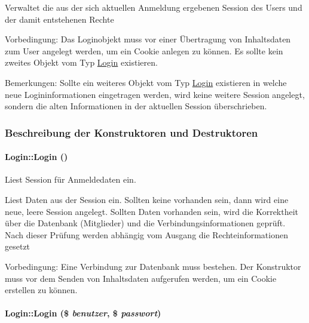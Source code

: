Verwaltet die aus der sich aktuellen Anmeldung ergebenen Session des Users und der damit entstehenen Rechte \begin{Desc}
\item[Vorbedingung:]Das Loginobjekt muss vor einer Übertragung von Inhaltsdaten zum User angelegt werden, um ein Cookie anlegen zu können. Es sollte kein zweites Objekt vom Typ \hyperlink{classLogin}{Login} existieren. \end{Desc}
\begin{Desc}
\item[Bemerkungen:]Sollte ein weiteres Objekt vom Typ \hyperlink{classLogin}{Login} existieren in welche neue Logininformationen eingetragen werden, wird keine weitere Session angelegt, sondern die alten Informationen in der aktuellen Session überschrieben. \end{Desc}




\subsubsection{Beschreibung der Konstruktoren und Destruktoren}
\hypertarget{classLogin_4847f3e07e43b540d3339392346f87ff}{
\paragraph[Login]{\setlength{\rightskip}{0pt plus 5cm}Login::Login ()}\hfill}
\label{classLogin_4847f3e07e43b540d3339392346f87ff}


Liest Session für Anmeldedaten ein. 

Liest Daten aus der Session ein. Sollten keine vorhanden sein, dann wird eine neue, leere Session angelegt. Sollten Daten vorhanden sein, wird die Korrektheit über die Datenbank (Mitglieder) und die Verbindungsinformationen geprüft. Nach dieser Prüfung werden abhängig vom Ausgang die Rechteinformationen gesetzt \begin{Desc}
\item[Vorbedingung:]Eine Verbindung zur Datenbank muss bestehen. Der Konstruktor muss vor dem Senden von Inhaltsdaten aufgerufen werden, um ein Cookie erstellen zu können. \end{Desc}
\hypertarget{classLogin_86b5c73ef1fb4bd03f91cc4771c960b7}{
\paragraph[Login]{\setlength{\rightskip}{0pt plus 5cm}Login::Login (\$ {\em benutzer}, \$ {\em passwort})}\hfill}
\label{classLogin_86b5c73ef1fb4bd03f91cc4771c960b7}


